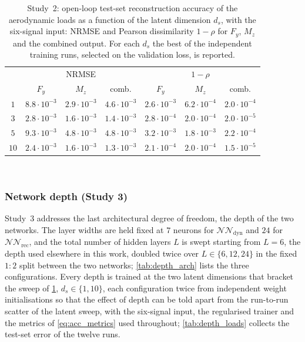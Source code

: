\begin{table}[t]
\centering
\begin{tabular}{|c|c|c|c|c|c|c|}
\hhline{|-|-|-|-|-|-|-|}
\rowcolor{bluePoli!40}
\multicolumn{1}{|c|}{} & \multicolumn{3}{c|}{NRMSE} & \multicolumn{3}{c|}{$1-\rho$} \T\B \\
\hhline{|~|-|-|-|-|-|-|}
\rowcolor{bluePoli!40}
\multicolumn{1}{|c|}{$d_s$} & \multicolumn{1}{c|}{$F_y$} & \multicolumn{1}{c|}{$M_z$} & \multicolumn{1}{c|}{comb.} & \multicolumn{1}{c|}{$F_y$} & \multicolumn{1}{c|}{$M_z$} & \multicolumn{1}{c|}{comb.} \T\B \\
\hhline{|=|=|=|=|=|=|=|}
$1$  & $8.8\cdot10^{-3}$ & $2.9\cdot10^{-3}$ & $4.6\cdot10^{-3}$ & $2.6\cdot10^{-3}$ & $6.2\cdot10^{-4}$ & $2.0\cdot10^{-4}$ \T\B \\
\hline
$3$  & $2.8\cdot10^{-3}$ & $1.6\cdot10^{-3}$ & $1.4\cdot10^{-3}$ & $2.8\cdot10^{-4}$ & $2.0\cdot10^{-4}$ & $2.0\cdot10^{-5}$ \T\B \\
\hline
$5$  & $9.3\cdot10^{-3}$ & $4.8\cdot10^{-3}$ & $4.8\cdot10^{-3}$ & $3.2\cdot10^{-3}$ & $1.8\cdot10^{-3}$ & $2.2\cdot10^{-4}$ \T\B \\
\hline
$10$ & $2.4\cdot10^{-3}$ & $1.6\cdot10^{-3}$ & $1.3\cdot10^{-3}$ & $2.1\cdot10^{-4}$ & $2.0\cdot10^{-4}$ & $1.5\cdot10^{-5}$ \B \\
\hline
\end{tabular}
\\[6pt]
\caption{Study~2: open-loop test-set reconstruction accuracy of the aerodynamic loads as a function of
the latent dimension $d_s$, with the six-signal input: NRMSE and Pearson dissimilarity $1-\rho$ for
$F_y$, $M_z$ and the combined output. For each $d_s$ the best of the independent training runs,
selected on the validation loss, is reported.}
\label{tab:latent_sweep}
\end{table}

\subsubsection{Network depth (Study 3)}
\label{subsubsec:depth}

Study~3 addresses the last architectural degree of freedom, the depth of the two networks. The layer widths are
held fixed at $7$ neurons for $\mathcal{NN}_\mathrm{dyn}$ and $24$ for $\mathcal{NN}_\mathrm{rec}$,
and the total number of hidden layers $L$ is swept starting from $L=6$, the depth used elsewhere
in this work, doubled twice over $L\in\{6,12,24\}$ in the fixed $1{:}2$ split between the two
networks; \cref{tab:depth_arch} lists the three configurations. Every depth is trained at the two
latent dimensions that bracket the sweep of \cref{tab:latent_sweep}, $d_s\in\{1,10\}$, each
configuration twice from independent weight initialisations so that the effect of depth can be
told apart from the run-to-run scatter of the latent sweep, with the six-signal input, the
regularised trainer and the metrics of \cref{eq:acc_metrics} used throughout; \cref{tab:depth_loads}
collects the test-set error of the twelve runs.


